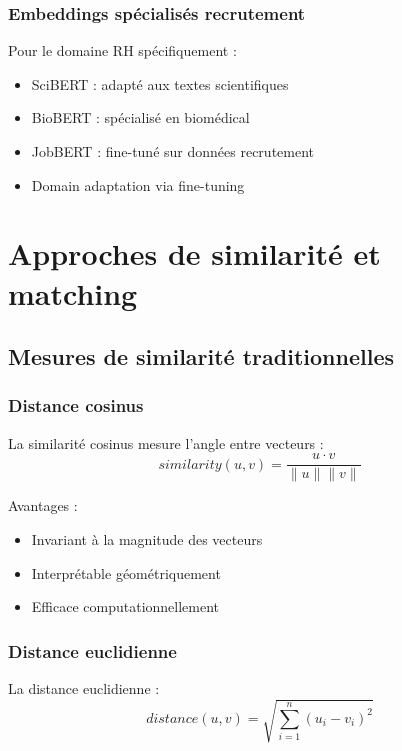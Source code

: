 \documentclass[12pt,a4paper]{report}
\begin{document}
\subsubsection{Embeddings spécialisés recrutement}

Pour le domaine RH spécifiquement :
\begin{itemize}
\item SciBERT : adapté aux textes scientifiques
\item BioBERT : spécialisé en biomédical
\item JobBERT : fine-tuné sur données recrutement
\item Domain adaptation via fine-tuning
\end{itemize}

\section{Approches de similarité et matching}

\subsection{Mesures de similarité traditionnelles}

\subsubsection{Distance cosinus}

La similarité cosinus mesure l'angle entre vecteurs :
\begin{equation}
similarity(u,v) = \frac{u \cdot v}{\|u\| \|v\|}
\end{equation}

Avantages :
\begin{itemize}
\item Invariant à la magnitude des vecteurs
\item Interprétable géométriquement
\item Efficace computationnellement
\end{itemize}

\subsubsection{Distance euclidienne}

La distance euclidienne :
\begin{equation}
distance(u,v) = \sqrt{\sum_{i=1}^{n}(u_i - v_i)^2}
\end{equation}
\end{document}

